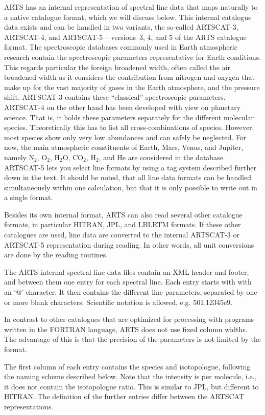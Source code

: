 ARTS has an internal representation of spectral line data that maps
naturally to a native catalogue format, which we will discuss
below. This internal catalogue data exists and can be
handled in two variants, the so-called ARTSCAT-3, ARTSCAT-4, and ARTSCAT-5 -- versions~3, 4, and 5
of the ARTS catalogue format. The spectroscopic databases commonly
used in Earth atmospheric research contain the spectroscopic parameters
representative for Earth conditions. This regards particular the foreign
broadened width, often called the air broadened width as it considers
the contribution from nitrogen and oxygen that make up for the vast majority
of gases in the Earth atmosphere, and the pressure shift. ARTSCAT-3 contains
these ``classical'' spectroscopic parameters. ARTSCAT-4 on the other hand has
been developed with view on planetary science. That is, it holds these
parameters separately for the different molecular species. Theoretically this
has to list all cross-combinations of species. However, most species show only
very low abundances and can safely be neglected. For now, the main atmospheric
constituents of Earth, Mars, Venus, and Jupiter, namely N$_2$, O$_2$, H$_2$O, CO$_2$, H$_2$,
and He are considered in the database.  ARTSCAT-5 lets you select line formats by using
a tag system described further down in the text.
It should be noted, that all line data formats can be handled simultaneously
within one calculation, but that it is only possible to write out in a
single format.

Besides its own internal format, ARTS can also read several other catalogue
formats, in particular HITRAN, JPL, and LBLRTM formats. If these other catalogues are used,
line data are converted to the internal ARTSCAT-3 or ARTSCAT-5 representation during
reading. In other words, all unit conversions are done by the reading
routines.

The ARTS internal spectral line data files contain
an XML header and footer, and between them one entry for each spectral line.
Each entry starts with with an `@' character. It then contains the different line
parameters, separated by one or more blank characters. Scientific
notation is allowed, e.g. 501.12345e9.  

In contrast to other catalogues that are optimized for processing with
programs written in the FORTRAN language, ARTS does not use fixed
column widths. The advantage of this is that the precision of the
parameters is not limited by the format.

The first column of each entry contains the species and isotopologue,
following the naming scheme described below. Note that the intensity
is per molecule, i.e., it does not contain the isotopologue ratio. This is
similar to JPL, but different to HITRAN.
The definition of the further entries differ between the ARTSCAT
representations.

